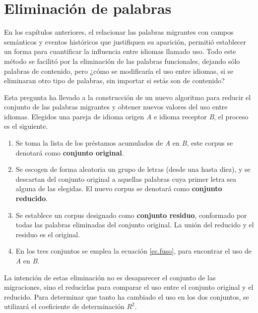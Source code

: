 \chapter{Eliminación de palabras}

En los capítulos anteriores, el relacionar las palabras migrantes con campos semánticos y eventos históricos que justifiquen su aparición, permitió establecer un forma para cuantificar la influencia entre idiomas llamado uso. Todo este método se facilitó por la eliminación de las palabras funcionales, dejando sólo palabras de contenido, pero ¿cómo se modificaría el uso entre idiomas,  si se eliminaran otro tipo de palabras, sin importar si estás son de contenido?

Esta pregunta ha llevado a la construcción de un nuevo algoritmo para reducir el conjunto de las palabras migrantes y obtener nuevos valores del uso entre idiomas.  Elegidos una pareja de idioma origen \textit{A} e idioma receptor \textit{B}, el proceso es el siguiente. 


\begin{enumerate}
	
	\item Se toma la lista de los préstamos acumulados de \textit{A} en \textit{B},  este corpus se denotará como \textbf{conjunto original}.
	
	\item Se escogen de forma aleatoria un grupo de letras (desde una hasta diez), y se descartan del conjunto original a aquellas  palabras cuya primer letra sea alguna de las elegidas. El nuevo corpus se denotará como \textbf{conjunto reducido}.
	
	\item Se establece un corpus  designado como \textbf{conjunto residuo}, conformado por todas las palabras eliminadas del conjunto original.  La unión del reducido y el residuo es el original. 
	
	\item En los tres conjuntos se emplea la ecuación \ref{ec.fuso}, para encontrar el uso de \textit{A} en \textit{B}. 	
	
\end{enumerate}

La intención de estas eliminación  no es desaparecer el conjunto de las migraciones, sino el reducirlas para  comparar el uso entre el conjunto original y el reducido.  Para determinar que tanto ha cambiado el uso en los dos conjuntos, se utilizará el coeficiente de determinación $R^{2}$. 

